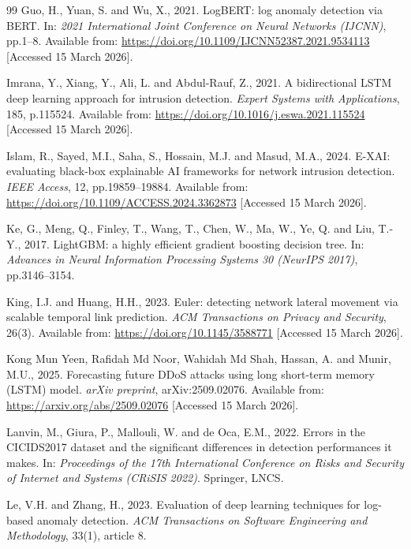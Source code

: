 \documentclass[12pt,a4paper]{report}
\begin{document}
\begin{thebibliography}{99}
Guo, H., Yuan, S. and Wu, X., 2021. LogBERT: log anomaly detection via BERT. In: \textit{2021 International Joint Conference on Neural Networks (IJCNN)}, pp.1--8. Available from: \url{https://doi.org/10.1109/IJCNN52387.2021.9534113} [Accessed 15 March 2026].

Imrana, Y., Xiang, Y., Ali, L. and Abdul-Rauf, Z., 2021. A bidirectional LSTM deep learning approach for intrusion detection. \textit{Expert Systems with Applications}, 185, p.115524. Available from: \url{https://doi.org/10.1016/j.eswa.2021.115524} [Accessed 15 March 2026].

Islam, R., Sayed, M.I., Saha, S., Hossain, M.J. and Masud, M.A., 2024. E-XAI: evaluating black-box explainable AI frameworks for network intrusion detection. \textit{IEEE Access}, 12, pp.19859--19884. Available from: \url{https://doi.org/10.1109/ACCESS.2024.3362873} [Accessed 15 March 2026].

Ke, G., Meng, Q., Finley, T., Wang, T., Chen, W., Ma, W., Ye, Q. and Liu, T.-Y., 2017. LightGBM: a highly efficient gradient boosting decision tree. In: \textit{Advances in Neural Information Processing Systems 30 (NeurIPS 2017)}, pp.3146--3154.

King, I.J. and Huang, H.H., 2023. Euler: detecting network lateral movement via scalable temporal link prediction. \textit{ACM Transactions on Privacy and Security}, 26(3). Available from: \url{https://doi.org/10.1145/3588771} [Accessed 15 March 2026].

Kong Mun Yeen, Rafidah Md Noor, Wahidah Md Shah, Hassan, A. and Munir, M.U., 2025. Forecasting future DDoS attacks using long short-term memory (LSTM) model. \textit{arXiv preprint}, arXiv:2509.02076. Available from: \url{https://arxiv.org/abs/2509.02076} [Accessed 15 March 2026].

Lanvin, M., Giura, P., Mallouli, W. and de Oca, E.M., 2022. Errors in the CICIDS2017 dataset and the significant differences in detection performances it makes. In: \textit{Proceedings of the 17th International Conference on Risks and Security of Internet and Systems (CRiSIS 2022)}. Springer, LNCS.

Le, V.H. and Zhang, H., 2023. Evaluation of deep learning techniques for log-based anomaly detection. \textit{ACM Transactions on Software Engineering and Methodology}, 33(1), article 8.


\end{thebibliography}
\end{document}
